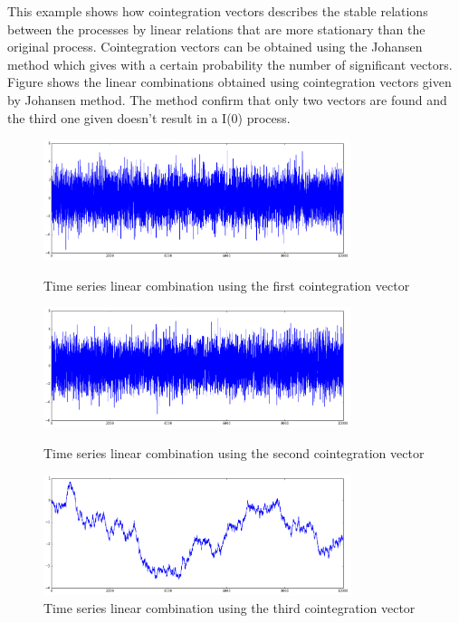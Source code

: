 This example shows how cointegration vectors describes the stable relations
between the processes by linear relations that are more stationary than the
original process. Cointegration vectors can be obtained using the Johansen method which gives with a certain probability the number of significant vectors. Figure \cite{fig:cointvectors1} shows the linear combinations obtained using cointegration vectors given by Johansen method. The method confirm that only two vectors are found and the third one given doesn't result in a I(0) process.


\begin{figure}[!h]
  \centering
 \begin{minipage}{\textwidth} %
  \centering
  \includegraphics[width=0.8\textwidth]{img/coint-example2} 
   \caption{Time series linear combination using the first cointegration vector }
   \includegraphics[width=0.8\textwidth]{img/coint-example3} 
    \caption{Time series linear combination using the second cointegration vector}
    \includegraphics[width=0.8\textwidth]{img/coint-example4}
 \caption{Time series linear combination using the third cointegration vector}
  \label{fig:cointvectors1}
\end{minipage}
\end{figure}


